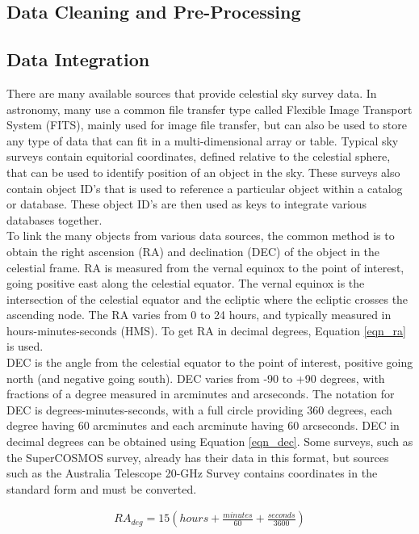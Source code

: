 \documentclass[11pt,sigconf]{acmart}
\begin{document}
\subsection{Data Cleaning and Pre-Processing}


\subsection{Data Integration}
There are many available sources that provide celestial sky survey data. In astronomy,
many use a common file transfer type called Flexible Image Transport System (FITS), 
mainly used for image file transfer, but can also be used to store any type of data 
that can fit in a multi-dimensional array or table. Typical sky surveys contain 
equitorial coordinates, defined relative to the celestial sphere, that can be used to 
identify position of an object in the sky. These surveys also contain object ID's that 
is used to reference a particular object within a catalog or database. These object 
ID's are then used as keys to integrate various databases together. 
\\
To link the many objects from various data sources, the common method is to obtain
the right ascension (RA) and declination (DEC) of the object in the celestial frame. 
RA is measured from the vernal equinox to the point of interest, going positive east
along the celestial equator. The vernal equinox is the intersection of the celestial 
equator and the ecliptic where the ecliptic crosses the ascending node. The RA varies 
from 0 to 24 hours, and typically measured in hours-minutes-seconds (HMS). To get RA 
in decimal degrees, Equation \ref{eqn_ra} is used. 
\\
DEC is the angle from the celestial equator to the point of interest, positive going 
north (and negative going south). DEC varies from -90 to +90 degrees, with fractions 
of a degree measured in arcminutes and arcseconds. The notation for DEC is 
degrees-minutes-seconds, with a full circle providing 360 degrees, each degree having 
60 arcminutes and each arcminute having 60 arcseconds. DEC in decimal degrees can be 
obtained using Equation \ref{eqn_dec}. Some surveys, such as the SuperCOSMOS survey, 
already has their data in this format, but sources such as the Australia Telescope 
20-GHz Survey contains coordinates in the standard form and must be converted.

\begin{equation} \label{eqn_ra}
  \begin{split}
    RA_{deg}= 15(hours + \frac{minutes}{60} + \frac{seconds}{3600}) 
  \end{split}
\end{equation}
\end{document}
